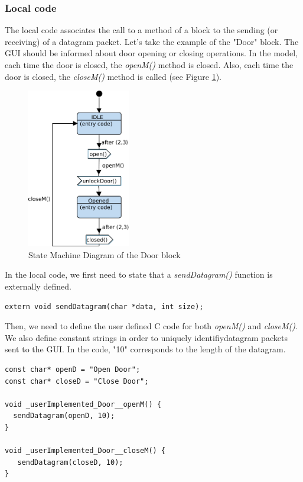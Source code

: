 \documentclass[12pt]{article}
\begin{document}
\subsubsection{Local code}
The local code associates the call to a method of a block to the sending (or receiving) of a datagram packet. Let's take the example of the "Door" block. The GUI should be informed about door opening or closing operations. In the model, each time the door is closed, the \textit{openM()} method is closed. Also, each time the door is closed, the \textit{closeM() }method is called (see Figure \ref{fig:door}).

\begin{figure}[htbp]
\centering
\includegraphics[width=0.4\textwidth]{figures/door}
\caption{State Machine Diagram of the Door block} \label{fig:door}
\end{figure}

In the local code, we first need to state that a \textit{sendDatagram()} function is externally defined.
 \begin{lstlisting}
extern void sendDatagram(char *data, int size);
\end{lstlisting}
Then, we need to define the user defined C code for both \textit{openM()} and \textit{closeM()}.  We also define constant strings in order to uniquely identifiydatagram packets sent to the GUI. In the code, "10" corresponds to the length of the datagram. 

\begin{lstlisting}
const char* openD = "Open Door";
const char* closeD = "Close Door";

void _userImplemented_Door__openM() {
  sendDatagram(openD, 10);
}

void _userImplemented_Door__closeM() {
   sendDatagram(closeD, 10);
}
\end{lstlisting}
\end{document}
